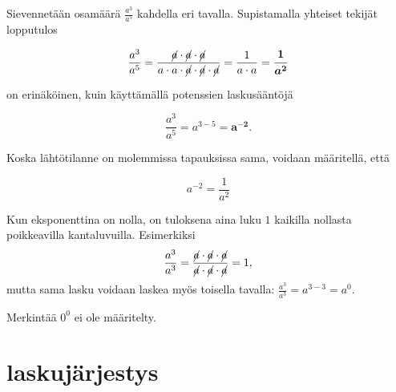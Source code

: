     Sievennetään osamäärä $\frac{a^3}{a^5}$ kahdella eri tavalla. Supistamalla yhteiset tekijät lopputulos
    
    \begin{equation*}
        \frac{a^3}{a^5} =
        \frac{\cancel{a}\cdot \cancel{a}\cdot \cancel{a}}{a\cdot a\cdot
        \cancel{a}\cdot \cancel{a}\cdot \cancel{a}} = 
        \frac{1}{a\cdot a}=\boldsymbol{\frac{1}{a^2}}
    \end{equation*}
    
    on erinäköinen, kuin käyttämällä potenssien laskusääntöjä
    
    \begin{equation*}
        \frac{a^3}{a^5} = a^{3-5}=\boldsymbol {a^{-2}}{.}
    \end{equation*}
    
    Koska lähtötilanne on molemmissa tapauksissa sama, voidaan määritellä, että
    
    \begin{equation*}
        a^{-2} = \frac{1}{a^2}
    \end{equation*}
    
    
    
    Kun eksponenttina on nolla, on tuloksena aina luku $1$ kaikilla nollasta poikkeavilla kantaluvuilla. 
    Esimerkiksi
    \[
        \frac{a^3}{a^3}=\frac{\cancel{a}\cdot \cancel{a}\cdot \cancel{a}}{\cancel{a}\cdot \cancel{a}\cdot \cancel{a}}=1,
    \]
    mutta sama lasku voidaan laskea myös toisella tavalla: $\frac{a^3}{a^3}=a^{3-3}=a^0$.

Merkintää $0^0$ ei ole määritelty.
    
    
    \section{laskujärjestys}
    
